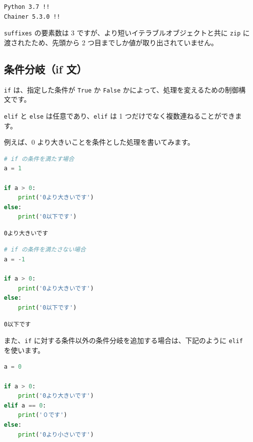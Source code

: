 \begin{lstlisting}[style=outputcell]
Python 3.7 !!
Chainer 5.3.0 !!
\end{lstlisting}

\texttt{suffixes} の要素数は 3 ですが、より短いイテラブルオブジェクトと共に \texttt{zip} に渡されたため、先頭から 2 つ目までしか値が取り出されていません。


\subsection{条件分岐（if 文）}


\texttt{if} は、指定した条件が \texttt{True} か \texttt{False} かによって、処理を変えるための制御構文です。




\texttt{elif} と \texttt{else} は任意であり、\texttt{elif} は 1 つだけでなく複数連ねることができます。


例えば、0 より大きいことを条件とした処理を書いてみます。


\begin{lstlisting}[style=codecell,language=Python]
# if の条件を満たす場合
a = 1

if a > 0:
    print('0より大きいです')
else:
    print('0以下です')
\end{lstlisting}

\begin{lstlisting}[style=outputcell]
0より大きいです
\end{lstlisting}

\begin{lstlisting}[style=codecell,language=Python]
# if の条件を満たさない場合
a = -1

if a > 0:
    print('0より大きいです')
else:
    print('0以下です')
\end{lstlisting}

\begin{lstlisting}[style=outputcell]
0以下です
\end{lstlisting}

また、\texttt{if} に対する条件以外の条件分岐を追加する場合は、下記のように \texttt{elif} を使います。


\begin{lstlisting}[style=codecell,language=Python]
a = 0

if a > 0:    
    print('0より大きいです')
elif a == 0:
    print('０です')
else:
    print('0より小さいです')
\end{lstlisting}

